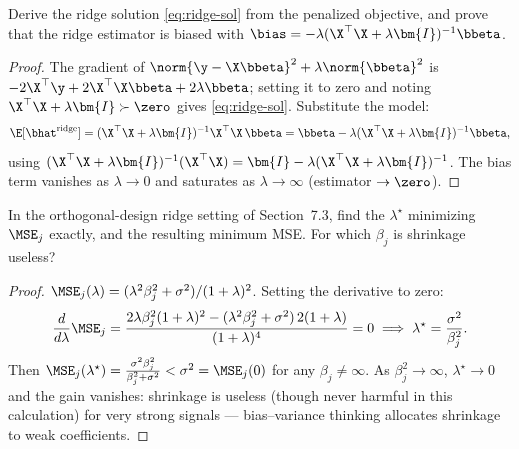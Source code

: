 \begin{exercise}\label{ex:ridge}
Derive the ridge solution \eqref{eq:ridge-sol} from the penalized objective, and prove that the ridge estimator is biased with $\bias = -\lambda(\X^\top\X + \lambda\bm{I})^{-1}\bbeta$.
\end{exercise}
\begin{proof}
The gradient of $\norm{\y - \X\bbeta}^2 + \lambda\norm{\bbeta}^2$ is $-2\X^\top\y + 2\X^\top\X\bbeta + 2\lambda\bbeta$; setting it to zero and noting $\X^\top\X + \lambda\bm{I} \succ \zero$ gives \eqref{eq:ridge-sol}. Substitute the model:
\[
  \E[\bhat^{\mathrm{ridge}}] = (\X^\top\X + \lambda\bm{I})^{-1}\X^\top\X\,\bbeta
  = \bbeta - \lambda(\X^\top\X + \lambda\bm{I})^{-1}\bbeta,
\]
using $(\X^\top\X + \lambda\bm{I})^{-1}(\X^\top\X) = \bm{I} - \lambda(\X^\top\X+\lambda\bm{I})^{-1}$. The bias term vanishes as $\lambda \to 0$ and saturates as $\lambda \to \infty$ (estimator $\to \zero$).
\end{proof}

\begin{exercise}
In the orthogonal-design ridge setting of Section~7.3, find the $\lambda^\star$ minimizing $\MSE_j$ exactly, and the resulting minimum MSE. For which $\beta_j$ is shrinkage useless?
\end{exercise}
\begin{proof}
$\MSE_j(\lambda) = (\lambda^2\beta_j^2 + \sigma^2)/(1+\lambda)^2$. Setting the derivative to zero:
\[
  \frac{d}{d\lambda}\MSE_j = \frac{2\lambda \beta_j^2 (1+\lambda)^2 - (\lambda^2\beta_j^2 + \sigma^2)\,2(1+\lambda)}{(1+\lambda)^4} = 0
  \;\Longrightarrow\; \lambda^\star = \frac{\sigma^2}{\beta_j^2}.
\]
Then $\MSE_j(\lambda^\star) = \frac{\sigma^2 \beta_j^2}{\beta_j^2 + \sigma^2} < \sigma^2 = \MSE_j(0)$ for any $\beta_j \neq \infty$. As $\beta_j^2 \to \infty$, $\lambda^\star \to 0$ and the gain vanishes: shrinkage is useless (though never harmful in this calculation) for very strong signals — bias--variance thinking allocates shrinkage to weak coefficients.
\end{proof}
